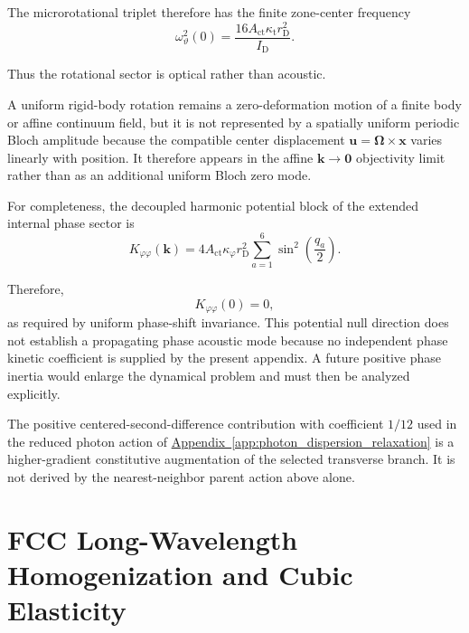 The microrotational triplet therefore has the finite zone-center frequency
\begin{equation}
    \boxed{
    \omega_{\vartheta}^2(0)
    =
    \frac{
        16A_{\mathrm{ct}}\kappa_{\mathrm{t}}r_{\mathrm{D}}^2
    }{
        I_{\mathrm{D}}
    }.
    }
\end{equation}

Thus the rotational sector is optical rather than acoustic.

A uniform rigid-body rotation remains a zero-deformation motion of a finite body or affine continuum field, but it is not represented by a spatially uniform periodic Bloch amplitude because the compatible center displacement $\mathbf{u}=\boldsymbol{\Omega}\times\mathbf{x}$ varies linearly with position. It therefore appears in the affine $\mathbf{k}\rightarrow\mathbf{0}$ objectivity limit rather than as an additional uniform Bloch zero mode.

For completeness, the decoupled harmonic potential block of the extended internal phase sector is
\begin{equation}
    K_{\varphi\varphi}(\mathbf{k})
    =
    4A_{\mathrm{ct}}\kappa_{\varphi}r_{\mathrm{D}}^2
    \sum_{a=1}^{6}
    \sin^2\!\left(\frac{q_a}{2}\right).
\end{equation}

Therefore,
\begin{equation}
    K_{\varphi\varphi}(0)=0,
\end{equation}
as required by uniform phase-shift invariance. This potential null direction does not establish a propagating phase acoustic mode because no independent phase kinetic coefficient is supplied by the present appendix. A future positive phase inertia would enlarge the dynamical problem and must then be analyzed explicitly.

The positive centered-second-difference contribution with coefficient $1/12$ used in the reduced photon action of \hyperref[app:photon_dispersion_relaxation]{Appendix~\ref*{app:photon_dispersion_relaxation}} is a higher-gradient constitutive augmentation of the selected transverse branch. It is not derived by the nearest-neighbor parent action above alone.


\section{FCC Long-Wavelength Homogenization and Cubic Elasticity}

